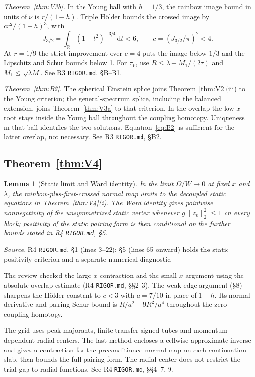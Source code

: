 \documentclass[11pt]{article}
\newcommand{\dd}{\,\mathrm d}
\newtheorem{lemma}[theorem]{Lemma}
\theoremstyle{definition}
\theoremstyle{remark}
\begin{document}
\emph{Theorem~\ref{thm:V3b}.} In the Young ball with $h=1/3$, the rainbow image bound in units of $\nu$ is $r/(1-h)$. Triple H\"older bounds the crossed image by $c r^2/(1-h)^3$, with
\[
J_{3/2}=\int_{\mathbb R}(1+t^2)^{-3/4}\dd t<6,\qquad c=(J_{3/2}/\pi)^2<4.
\]
At $r=1/9$ the strict improvement over $c=4$ puts the image below $1/3$ and the Lipschitz and Schur bounds below 1. For $\tau_Y$, use $R\le\lambda+M_1/(2\tau)$ and $M_1\le\sqrt{\lambda M}$. See R3 \texttt{RIGOR.md}, \S B--B1.

\emph{Theorem~\ref{thm:B2}.} The spherical Einstein splice joins Theorem~\ref{thm:V2}(iii) to the Young criterion; the general-spectrum splice, including the balanced extension, joins Theorem~\ref{thm:V3a} to that criterion. In the overlap the low-$x$ root stays inside the Young ball throughout the coupling homotopy. Uniqueness in that ball identifies the two solutions. Equation~\eqref{eq:B2} is sufficient for the latter overlap, not necessary. See R3 \texttt{RIGOR.md}, \S B2.

\subsection{Theorem~\ref{thm:V4}}

\begin{lemma}[Static limit and Ward identity]\label{lem:static}
In the limit $\Omega/W\to0$ at fixed $x$ and $\lambda$, the rainbow-plus-first-crossed normal map limits to the decoupled static equations in Theorem~\ref{thm:V4}(i). The Ward identity gives pointwise nonnegativity of the unsymmetrized static vertex whenever $g\|z_n\|_2^2\le1$ on every block; positivity of the static pairing form is then conditional on the further bounds stated in R4 \texttt{RIGOR.md}, \S5.
\end{lemma}

\noindent\emph{Source.} R4 \texttt{RIGOR.md}, \S1 (lines 3--22); \S5 (lines 65 onward) holds the static positivity criterion and a separate numerical diagnostic.

The review checked the large-$x$ contraction and the small-$x$ argument using the absolute overlap estimate (R4 \texttt{RIGOR.md}, \S\S2--3). The weak-edge argument (\S8) sharpens the H\"older constant to $c<3$ with $a=7/10$ in place of $1-h$. Its normal derivative and pairing Schur bound is $R/a^2+9R^2/a^4$ throughout the zero-coupling homotopy.

The grid uses peak majorants, finite-transfer signed tubes and momentum-dependent radial centers. The last method encloses a cellwise approximate inverse and gives a contraction for the preconditioned normal map on each continuation slab, then bounds the full pairing form. The radial center does not restrict the trial gap to radial functions. See R4 \texttt{RIGOR.md}, \S\S4--7, 9.
\end{document}

